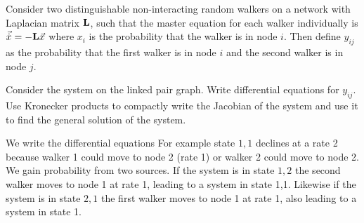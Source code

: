 Consider two distinguishable non-interacting random walkers on a network with Laplacian matrix $\bf L$, such that the master equation for each walker individually is $\vec{\dot{x}}=-{\bf L}\vec{x}$ where $x_i$ is the probability that the walker is in node $i$. Then define $y_{ij}$ as the probability that the first walker is in node $i$ and the second walker is in node $j$.

\subquestion Consider the system on the linked pair graph. Write differential equations for $y_{ij}$. Use Kronecker products to compactly write the Jacobian of the system and use it to find the general solution of the system. 

\solution 
We write the differential equations
For example state $1,1$ declines at a rate 2 because walker 1 could move to node 2 (rate 1) or walker 2 could move to node 2. We gain probability from two sources. If the system is in state $1,2$ the second walker moves to node 1 at rate 1, leading to a system in state 1,1. Likewise if the system is in state $2,1$ the first walker moves to node 1 at rate 1, also leading to a system in state 1. 

